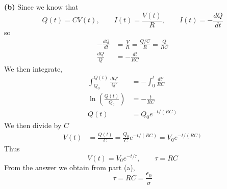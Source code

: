 \documentclass[12pt]{article}
\begin{document}
\begin{enumerate}
  \medskip
  \textbf{(b)}
  Since we know that
  \[
  Q(t)=CV(t),\qquad I(t)=\frac{V(t)}{R},\qquad I(t)=-\frac{dQ}{dt}
  \]
  so
  \[
  \begin{aligned}
  -\frac{dQ}{dt}
  &=\frac{V}{R}
  =\frac{Q/C}{R}
  =\frac{Q}{RC}\\[4pt]
  \frac{dQ}{Q}
  &=-\frac{dt}{RC}
  \end{aligned}
  \]
  We then integrate,
  \[
  \begin{aligned}
  \int_{Q_0}^{Q(t)}\frac{dQ'}{Q'}
  &=-\int_0^t \frac{dt'}{RC}\\[4pt]
  \ln\!\left(\frac{Q(t)}{Q_0}\right)
  &=-\frac{t}{RC}\\[4pt]
  Q(t)
  &=Q_0 e^{-t/(RC)}
  \end{aligned}
  \]
  We then divide by $C$
  \[
  \begin{aligned}
  V(t)
  &=\frac{Q(t)}{C}
  =\frac{Q_0}{C}e^{-t/(RC)}
  =V_0 e^{-t/(RC)}
  \end{aligned}
  \]
  Thus
  \[
V(t)=V_0 e^{-t/\tau},\qquad \tau=RC
  \]
  From the answer we obtain from part (a),
  \[
  \boxed{\tau=RC=\frac{\epsilon_0}{\sigma}}
  \]

\end{enumerate}

\newpage%
\end{document}
